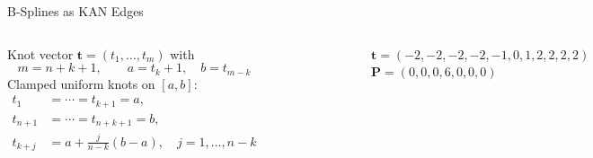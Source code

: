\documentclass[aspectratio=169]{beamer}
\begin{document}

\begin{frame}{B-Splines as KAN Edges}
	
	\begin{columns}[T,onlytextwidth]
		
		
		Knot vector $\mathbf{t}=(t_1,\dots,t_{m})$ with
		$$m=n+k+1,\qquad a=t_k+1,\quad b=t_{m-k}$$
		Clamped uniform knots on $[a,b]$:
		\begin{align*}
			t_1 &=\cdots=t_{k+1}=a,\\
			t_{n+1} &=\cdots=t_{n+k+1}=b,\\
			t_{k+j} &= a+\frac{j}{n-k}(b-a),\quad j=1,\dots,n-k\\
		\end{align*}
		
		\begin{figure}
			\centering
			\includegraphics[height=0.6\textheight]{../images/Cardinal_cubic_B-spline2.png}
		\end{figure}
		$\mathbf{t}=(-2, -2, -2, -2, -1, 0, 1, 2, 2, 2, 2)$\\
		$\mathbf{P}=(0, 0, 0, 6, 0, 0, 0)$
		
	\end{columns}
	
\end{frame}

\end{document}
